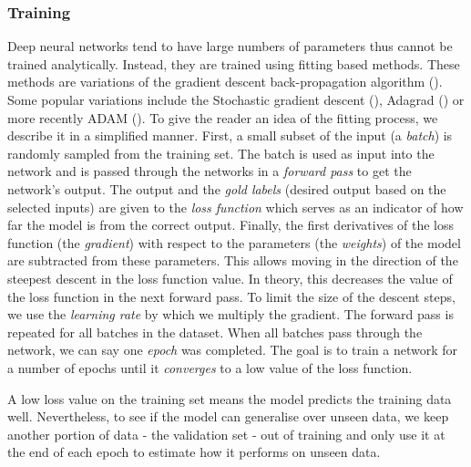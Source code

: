 \subsubsection{Training}
Deep neural networks tend to have large numbers of parameters thus cannot be trained analytically.
Instead, they are trained using fitting based methods.
These methods are variations of the gradient descent back-propagation algorithm (\cite{back-prop}).
Some popular variations include the Stochastic gradient descent (\cite{sgd}), Adagrad (\cite{adagrad}) or more recently ADAM (\cite{kingma-adam-2017}).
To give the reader an idea of the fitting process, we describe it in a simplified manner. 
First, a small subset of the input (a \textit{batch}) is randomly sampled from the training set. 
The batch is used as input into the network and is passed through the networks in a \textit{forward pass} to get the network's output. 
The output and the \textit{gold labels} (desired output based on the selected inputs) are given to the \textit{loss function} which serves as an indicator of how far the model is from the correct output. 
Finally, the first derivatives of the loss function (the \textit{gradient}) with respect to the parameters (the \textit{weights}) of the model are subtracted from these parameters.
This allows moving in the direction of the steepest descent in the loss function value. In theory, this decreases the value of the loss function in the next forward pass.
To limit the size of the descent steps, we use the \textit{learning rate} by which we multiply the gradient.
The forward pass is repeated for all batches in the dataset.
When all batches pass through the network, we can say one \textit{epoch} was completed.
The goal is to train a network for a number of epochs until it \textit{converges} to a low value of the loss function.

A low loss value on the training set means the model predicts the training data well.
Nevertheless, to see if the model can generalise over unseen data, we keep another portion of data - the validation set - out of training and only use it at the end of each epoch to estimate how it performs on unseen data. 

